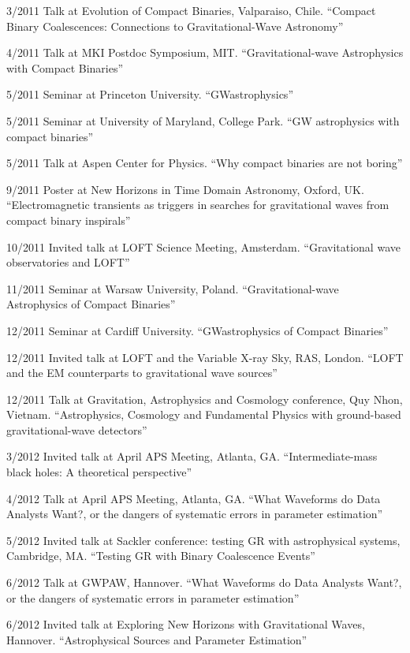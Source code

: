 \documentclass[margin,line]{res}
\begin{document}
\begin{resume}
3/2011 	Talk at Evolution of Compact Binaries, Valparaiso, Chile. 	``Compact Binary Coalescences: Connections to Gravitational-Wave Astronomy'' 

4/2011 	Talk 	at MKI Postdoc Symposium, MIT. 	``Gravitational-wave Astrophysics with Compact Binaries''

5/2011 	Seminar 	at Princeton University.	``GWastrophysics''

5/2011 	Seminar 	at University of Maryland, College Park. 	``GW astrophysics with compact binaries''

5/2011 	Talk 	at Aspen Center for Physics. 	``Why compact binaries are not boring''

9/2011	Poster at New Horizons in Time Domain Astronomy, Oxford, UK.  ``Electromagnetic transients as triggers in searches for gravitational waves from compact binary inspirals''

10/2011	Invited talk at LOFT Science Meeting, Amsterdam. ``Gravitational wave observatories and LOFT''

11/2011	Seminar at Warsaw University, Poland. ``Gravitational-wave Astrophysics of Compact Binaries''

12/2011	Seminar at Cardiff University. 	``GWastrophysics of Compact Binaries''

12/2011	Invited talk at LOFT and the Variable X-ray Sky, RAS, London. ``LOFT and the EM counterparts to gravitational wave sources''

12/2011	Talk at Gravitation, Astrophysics and Cosmology conference, Quy Nhon, Vietnam.  ``Astrophysics, Cosmology and Fundamental Physics with ground-based gravitational-wave detectors''

3/2012 	Invited talk at April APS Meeting, Atlanta, GA. 	``Intermediate-mass black holes: A theoretical perspective''

4/2012 	Talk 	at April APS Meeting, Atlanta, GA.  ``What Waveforms do Data Analysts Want?, or the dangers of systematic errors in parameter estimation''

5/2012 	Invited talk at Sackler conference: testing GR with astrophysical systems, Cambridge, MA. 	``Testing GR with Binary Coalescence Events''

6/2012 	Talk 	at GWPAW, Hannover.  ``What Waveforms do Data Analysts Want?, or the dangers of systematic errors in parameter estimation''

6/2012 	Invited talk at Exploring New Horizons with Gravitational Waves, Hannover.   ``Astrophysical Sources and Parameter Estimation''


\end{resume}
\end{document}
